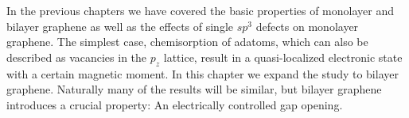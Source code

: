 %

In the previous chapters we have covered the basic properties of monolayer and bilayer graphene as well as the effects of single $sp^3$ defects on monolayer graphene. The simplest case, chemisorption of  adatoms, which can also be described as vacancies in the $p_z$ lattice, result in a quasi-localized electronic state with a certain magnetic moment. In this chapter we expand the study to bilayer graphene. Naturally many of the results will be similar, but bilayer graphene introduces a crucial property: An electrically controlled gap opening.


